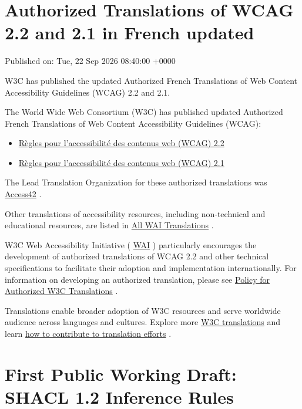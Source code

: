 \documentclass[11pt,a4paper]{article}
\begin{document}
\section{Authorized Translations of WCAG 2.2 and 2.1 in French updated}

Published on: Tue, 22 Sep 2026 08:40:00 +0000

W3C has published the updated Authorized French Translations of Web Content Accessibility Guidelines (WCAG) 2.2 and 2.1.

The World Wide Web Consortium (W3C) has published updated Authorized French Translations of Web Content Accessibility Guidelines (WCAG):

\begin{itemize}
\item \href{https://www.w3.org/Translations/WCAG22-fr-20260922/}{Règles pour l'accessibilité des contenus web (WCAG) 2.2}
\item \href{https://www.w3.org/Translations/WCAG21-fr-20260922/}{Règles pour l'accessibilité des contenus web (WCAG) 2.1}
\end{itemize}

The Lead Translation Organization for these authorized translations was \href{https://access42.net/}{Access42} .

Other translations of accessibility resources, including non-technical and educational resources, are listed in \href{https://www.w3.org/WAI/translations/}{All WAI Translations} .

W3C Web Accessibility Initiative ( \href{https://www.w3.org/WAI/}{WAI} ) particularly encourages the development of authorized translations of WCAG 2.2 and other technical specifications to facilitate their adoption and implementation internationally. For information on developing an authorized translation, please see \href{https://www.w3.org/2005/02/TranslationPolicy}{Policy for Authorized W3C Translations} .

Translations enable broader adoption of W3C resources and serve worldwide audience across languages and cultures. Explore more \href{https://www.w3.org/Translations/}{W3C translations} and learn \href{https://www.w3.org/Consortium/Translation/}{how to contribute to translation efforts} .

\section{First Public Working Draft: SHACL 1.2 Inference Rules}
\end{document}
